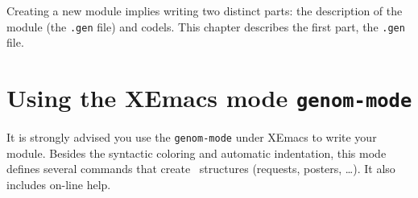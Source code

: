 %
%
%
%
%
%
%

Creating a new module implies writing two distinct parts: the description
of the module  (the {\tt .gen} file)  and codels. This  chapter describes
the first part, the {\tt .gen} file.

\section{Using the XEmacs mode {\tt genom-mode}}

It is strongly advised you use the {\tt genom-mode} under XEmacs to write
your module.  Besides the syntactic  coloring and automatic  indentation,
this   mode defines several   commands   that create  \GenoM\  structures
(requests, posters, \ldots). It also includes on-line help.

